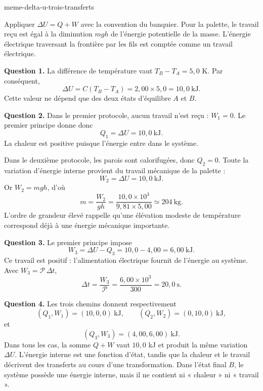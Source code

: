 \begin{exo}{meme-delta-u-trois-transferts}
\begin{indication}
Appliquer $\Delta U=Q+W$ avec la convention du banquier. Pour la palette,
le travail reçu est égal à la diminution $mgh$ de l'énergie potentielle de la
masse. L'énergie électrique traversant la frontière par les fils est comptée
comme un travail électrique.
\end{indication}

\begin{solution}
\textbf{Question 1.} La différence de température vaut
$T_B-T_A=5{,}0$ K. Par conséquent,
\[
\Delta U=C(T_B-T_A)
=2{,}00\times5{,}0
=10{,}0\ \mathrm{kJ}.
\]
Cette valeur ne dépend que des deux états d'équilibre $A$ et $B$.

\textbf{Question 2.} Dans le premier protocole, aucun travail n'est reçu :
$W_1=0$. Le premier principe donne donc
\[
Q_1=\Delta U=10{,}0\ \mathrm{kJ}.
\]
La chaleur est positive puisque l'énergie entre dans le système.

Dans le deuxième protocole, les parois sont calorifugées, donc $Q_2=0$.
Toute la variation d'énergie interne provient du travail mécanique de la
palette :
\[
W_2=\Delta U=10{,}0\ \mathrm{kJ}.
\]
Or $W_2=mgh$, d'où
\[
m=\frac{W_2}{gh}
=\frac{10{,}0\times10^3}{9{,}81\times5{,}00}
\simeq 204\ \mathrm{kg}.
\]
L'ordre de grandeur élevé rappelle qu'une élévation modeste de température
correspond déjà à une énergie mécanique importante.

\textbf{Question 3.} Le premier principe impose
\[
W_3=\Delta U-Q_3=10{,}0-4{,}00=6{,}00\ \mathrm{kJ}.
\]
Ce travail est positif : l'alimentation électrique fournit de l'énergie au
système. Avec $W_3=\mathcal P\,\Delta t$,
\[
\Delta t=\frac{W_3}{\mathcal P}
=\frac{6{,}00\times10^3}{300}
=20{,}0\ \mathrm{s}.
\]

\textbf{Question 4.} Les trois chemins donnent respectivement
\[
(Q_1,W_1)=(10{,}0,0)\ \mathrm{kJ},
\qquad
(Q_2,W_2)=(0,10{,}0)\ \mathrm{kJ},
\]
et
\[
(Q_3,W_3)=(4{,}00,6{,}00)\ \mathrm{kJ}.
\]
Dans tous les cas, la somme $Q+W$ vaut $10{,}0$ kJ et produit la même
variation $\Delta U$. L'énergie interne est une fonction d'état, tandis que
la chaleur et le travail décrivent des transferts au cours d'une
transformation. Dans l'état final $B$, le système possède une énergie interne,
mais il ne contient ni « chaleur » ni « travail ».
\end{solution}
\end{exo}

